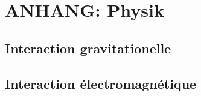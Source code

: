\chapter{ANHANG: Physik}
\section{Interaction gravitationelle}
\section{Interaction électromagnétique}
